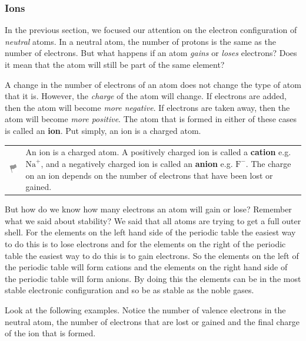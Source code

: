             \subsubsection{ Ions}
            \nopagebreak
            \label{m38757*id260625}In the previous section, we focused our attention on the electron configuration of \textsl{neutral} atoms. In a neutral atom, the number of protons is the same as the number of electrons. But what happens if an atom \textsl{gains} or \textsl{loses} electrons? Does it mean that the atom will still be part of the same element?\par 
        \label{m38757*id260647}A change in the number of electrons of an atom does not change the type of atom that it is. However, the \textsl{charge} of the atom will change. If electrons are added, then the atom will become \textsl{more negative}. If electrons are taken away, then the atom will become \textsl{more positive}. The atom that is formed in either of these cases is called an \textbf{ion}. Put simply, an ion is a charged atom.\par 
\label{m38757*fhsst!!!underscore!!!id815}\begin{definition}
	  \begin{tabular*}{15 cm}{m{15 mm}m{}}
	\hspace*{-50pt}  \includegraphics[width=0.5in]{col11305.imgs/psflag2.png}   & \Definition{   \label{id2424842}\textbf{ Ion }} { \label{m38757*meaningfhsst!!!underscore!!!id815}
        \label{m38757*id260685}An ion is a charged atom. A positively charged ion is called a \textbf{cation} e.g. ${\mathrm{Na}}^{+}$, and a negatively charged ion is called an \textbf{anion} e.g. ${\mathrm{F}}^{-}$. The charge on an ion depends on the number of electrons that have been lost or gained. \par 
         } 
      \end{tabular*}
      \end{definition}
        \label{m38757*eip-879}But how do we know how many electrons an atom will gain or lose? Remember what we said about stability? We said that all atoms are trying to get a full outer shell. For the elements on the left hand side of the periodic table the easiest way to do this is to lose electrons and for the elements on the right of the periodic table the easiest way to do this is to gain electrons. So the elements on the left of the periodic table will form cations and the elements on the right hand side of the periodic table will form anions. By doing this the elements can be in the most stable electronic configuration and so be as stable as the noble gases.\par \label{m38757*id260742}Look at the following examples. Notice the number of valence electrons in the neutral atom, the number of electrons that are lost or gained and the final charge of the ion that is formed.\par 
